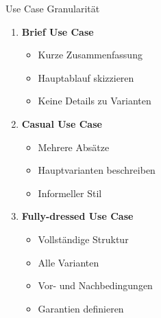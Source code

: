 \begin{concept}{Use Case Granularität}
\begin{enumerate}
    \item \textbf{Brief Use Case}
    \begin{itemize}
        \item Kurze Zusammenfassung
        \item Hauptablauf skizzieren
        \item Keine Details zu Varianten
    \end{itemize}
    \item \textbf{Casual Use Case}
    \begin{itemize}
        \item Mehrere Absätze
        \item Hauptvarianten beschreiben
        \item Informeller Stil
    \end{itemize}
    \item \textbf{Fully-dressed Use Case}
    \begin{itemize}
        \item Vollständige Struktur
        \item Alle Varianten
        \item Vor- und Nachbedingungen
        \item Garantien definieren
    \end{itemize}
\end{enumerate}
\end{concept}

